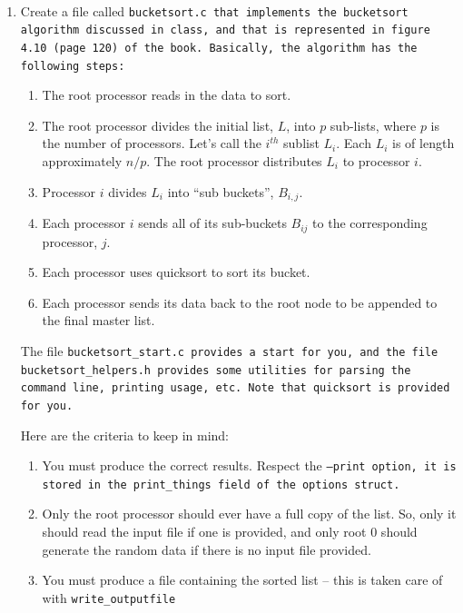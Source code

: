 \documentclass{article}
\begin{document}
\\
\begin{enumerate}
\item Create a file called \tt{bucketsort.c} that implements the
  bucketsort algorithm discussed in class, and that is represented in
  figure 4.10 (page 120) of the book.  Basically, the algorithm has
  the following steps:
  \begin{enumerate}
  \item The root processor reads in the data to sort.  
  \item The root processor divides the initial list, $L$, into $p$
    sub-lists, where $p$ is the number of processors. Let's call the
    $i^{th}$ sublist $L_i$. Each $L_i$ is  of length approximately
    $n/p$.  The root processor distributes $L_i$ to processor $i$. 
  \item Processor $i$ divides $L_i$ into ``sub buckets'',
    $B_{i,j}$.
    
  \item Each processor $i$ sends all of its sub-buckets $B_{ij}$ to
    the corresponding processor, $j$. 

  \item Each processor uses quicksort to sort its bucket.
    
  \item Each processor sends its data back to the root node to be
    appended to the final master list. 
  \end{enumerate}

The file \tt{bucketsort\_start.c} provides a start for you, and the
file \tt{bucketsort\_helpers.h} provides some utilities for parsing
the command line, printing usage, etc.  Note that \tt{quicksort} is
provided for you. 

Here are the criteria to keep in mind:
\begin{enumerate}
\item You must produce the correct results.  Respect the \tt{--print}
  option, it is stored in the \tt{print\_things} field of the options
  struct. 
\item Only the root processor should ever have a full copy of the
  list.  So, only it should read the input file if one is provided,
  and only root 0 should generate the random data if there is no input
  file provided. 
\item You must produce a file containing the sorted list -- this is
  taken care of with \tt{write\_outputfile}


\end{enumerate}
\end{enumerate}
\end{document}
